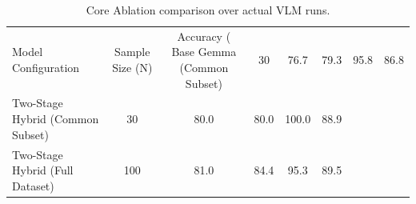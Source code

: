 \begin{table}[htbp]
  \centering
  \caption{Core Ablation comparison over actual VLM runs.}
  \label{tab:ablation_study}
  \begin{tabular}{lccccc}
    \toprule
    Model Configuration & Sample Size (N) & Accuracy (%
    \midrule
    Base Gemma (Common Subset) & 30 & 76.7 & 79.3 & 95.8 & 86.8 \\
    Two-Stage Hybrid (Common Subset) & 30 & 80.0 & 80.0 & 100.0 & 88.9 \\
    Two-Stage Hybrid (Full Dataset) & 100 & 81.0 & 84.4 & 95.3 & 89.5 \\
    \bottomrule
  \end{tabular}
\end{table}